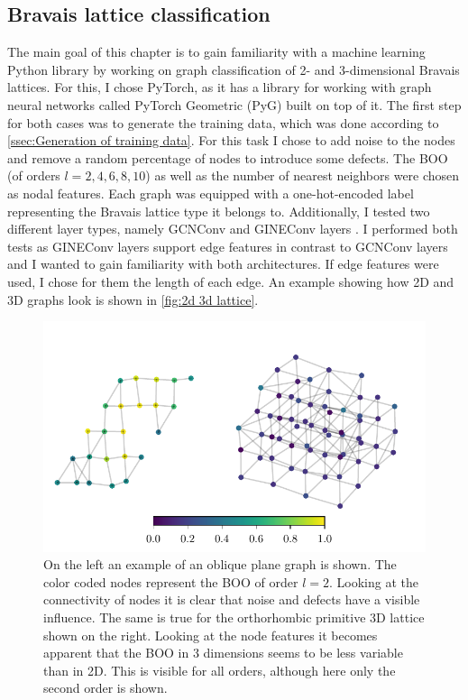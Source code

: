 \documentclass[11pt,a4paper]{article}
\begin{document}
\subsection{Bravais lattice classification}
\label{ssec:Bravais lattice classification}
The main goal of this chapter is to gain familiarity with a machine learning Python library by working on graph classification of 2- and 3-dimensional Bravais lattices. 
For this, I chose PyTorch, as it has a library for working with graph neural networks called PyTorch Geometric (PyG) built on top of it. 
The first step for both cases was to generate the training data, which was done according to \autoref{ssec:Generation of training data}. 
For this task I chose to add noise to the nodes and remove a random percentage of nodes to introduce some defects. 
The BOO (of orders $l=2,4,6,8,10$) as well as the number of nearest neighbors  were chosen as nodal features. 
Each graph was equipped with a one-hot-encoded label representing the Bravais lattice type it belongs to. 
Additionally, I tested two different layer types, namely GCNConv \cite{pygteamGCNConv2025} and GINEConv layers \cite{pygteamGINEConv2024}. 
I performed both tests as GINEConv layers support edge features in contrast to GCNConv layers and I wanted to gain familiarity with both architectures. 
If edge features were used, I chose for them the length of each edge. 
An example showing how 2D and 3D graphs look is shown in \autoref{fig:2d 3d lattice}. 

\begin{figure}[htbp]
    \centering
    \includegraphics{images/plots/2d_3d_lattice.pdf}
    \caption{On the left an example of an oblique plane graph is shown. The color coded nodes represent the BOO of order $l=2$. Looking at the connectivity of nodes it is clear that noise and defects have a visible influence. The same is true for the orthorhombic primitive 3D lattice shown on the right. Looking at the node features it becomes apparent that the BOO in 3 dimensions seems to be less variable than in 2D. This is visible for all orders, although here only the second order is shown.}
    \label{fig:2d 3d lattice}
\end{figure}
\end{document}
